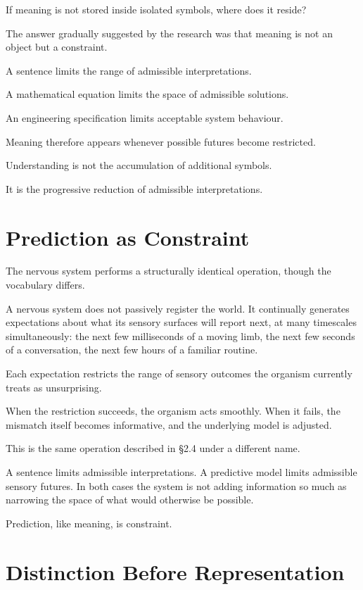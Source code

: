 \documentclass[11pt,oneside]{book}
\numberwithin{equation}{chapter}
\theoremstyle{definition}
\theoremstyle{plain}
\begin{document}
If meaning is not stored inside isolated symbols, where does it reside?

The answer gradually suggested by the research was that meaning is not an
object but a constraint.

A sentence limits the range of admissible interpretations.

A mathematical equation limits the space of admissible solutions.

An engineering specification limits acceptable system behaviour.

Meaning therefore appears whenever possible futures become restricted.

Understanding is not the accumulation of additional symbols.

It is the progressive reduction of admissible interpretations.

\section{Prediction as Constraint}

The nervous system performs a structurally identical operation, though the
vocabulary differs.

A nervous system does not passively register the world. It continually
generates expectations about what its sensory surfaces will report next, at
many timescales simultaneously: the next few milliseconds of a moving limb,
the next few seconds of a conversation, the next few hours of a familiar
routine.

Each expectation restricts the range of sensory outcomes the organism
currently treats as unsurprising.

When the restriction succeeds, the organism acts smoothly. When it fails,
the mismatch itself becomes informative, and the underlying model is
adjusted.

This is the same operation described in \S 2.4 under a different name.

A sentence limits admissible interpretations. A predictive model limits
admissible sensory futures. In both cases the system is not adding
information so much as narrowing the space of what would otherwise be
possible.

Prediction, like meaning, is constraint.

\section{Distinction Before Representation}
\end{document}
